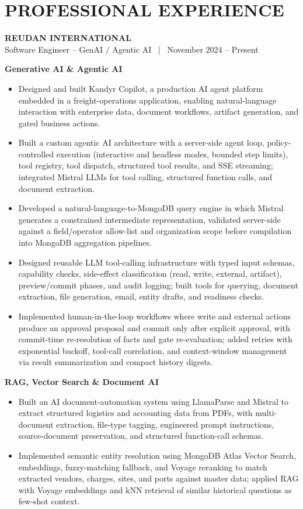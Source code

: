 \documentclass[letterpaper,9pt]{extarticle}
\newcommand{\role}[2]{%
  \textbf{\large #1}\\[1pt]
  {\color{graytext}#2}\par\vspace{1.5pt}}
\newcommand{\subhead}[1]{\vspace{2.5pt}\textbf{\color{accent}#1}\par\vspace{1pt}}
\newenvironment{points}
  {\begin{itemize}[leftmargin=11pt,itemsep=1.1pt,parsep=0pt,topsep=1pt,
                   partopsep=0pt,label=\textbullet]}
  {\end{itemize}}
\begin{document}
\section*{PROFESSIONAL EXPERIENCE}

\role{REUDAN INTERNATIONAL}{Software Engineer -- GenAI / Agentic AI ~|~ November 2024 -- Present}

\subhead{Generative AI \& Agentic AI}
\begin{points}
  \item Designed and built Kandyr Copilot, a production AI agent platform embedded in a freight-operations
        application, enabling natural-language interaction with enterprise data, document workflows, artifact
        generation, and gated business actions.
  \item Built a custom agentic AI architecture with a server-side agent loop, policy-controlled execution
        (interactive and headless modes, bounded step limits), tool registry, tool dispatch, structured tool
        results, and SSE streaming; integrated Mistral LLMs for tool calling, structured function calls, and
        document extraction.
  \item Developed a natural-language-to-MongoDB query engine in which Mistral generates a constrained
        intermediate representation, validated server-side against a field/operator allow-list and organization
        scope before compilation into MongoDB aggregation pipelines.
  \item Designed reusable LLM tool-calling infrastructure with typed input schemas, capability checks,
        side-effect classification (read, write, external, artifact), preview/commit phases, and audit logging;
        built tools for querying, document extraction, file generation, email, entity drafts, and readiness checks.
  \item Implemented human-in-the-loop workflows where write and external actions produce an approval proposal and
        commit only after explicit approval, with commit-time re-resolution of facts and gate re-evaluation; added
        retries with exponential backoff, tool-call correlation, and context-window management via result
        summarization and compact history digests.
\end{points}

\subhead{RAG, Vector Search \& Document AI}
\begin{points}
  \item Built an AI document-automation system using LlamaParse and Mistral to extract structured logistics and
        accounting data from PDFs, with multi-document extraction, file-type tagging, engineered prompt
        instructions, source-document preservation, and structured function-call schemas.
  \item Implemented semantic entity resolution using MongoDB Atlas Vector Search, embeddings, fuzzy-matching
        fallback, and Voyage reranking to match extracted vendors, charges, sites, and ports against master data;
        applied RAG with Voyage embeddings and kNN retrieval of similar historical questions as few-shot context.
\end{points}
\end{document}
